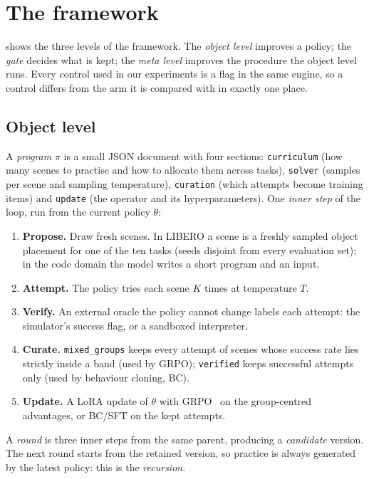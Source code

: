 \section{The framework}
\label{sec:framework}

 shows the three levels of the framework. The \emph{object level} improves a policy; the \emph{gate} decides what is kept; the \emph{meta level} improves the procedure the object level runs. Every control used in our experiments is a flag in the same engine, so a control differs from the arm it is compared with in exactly one place.

\subsection{Object level}
A \emph{program} $\pi$ is a small JSON document with four sections: \texttt{curriculum} (how many scenes to practise and how to allocate them across tasks), \texttt{solver} (samples per scene and sampling temperature), \texttt{curation} (which attempts become training items) and \texttt{update} (the operator and its hyperparameters). One \emph{inner step} of the loop, run from the current policy $\theta$:
\begin{enumerate}[nosep]
  \item \textbf{Propose.} Draw fresh scenes. In LIBERO a scene is a freshly sampled object placement for one of the ten tasks (seeds disjoint from every evaluation set); in the code domain the model writes a short program and an input.
  \item \textbf{Attempt.} The policy tries each scene $K$ times at temperature $T$.
  \item \textbf{Verify.} An external oracle the policy cannot change labels each attempt: the simulator's success flag, or a sandboxed interpreter.
  \item \textbf{Curate.} \texttt{mixed\_groups} keeps every attempt of scenes whose success rate lies strictly inside a band (used by GRPO); \texttt{verified} keeps successful attempts only (used by behaviour cloning, BC).
  \item \textbf{Update.} A LoRA update of $\theta$ with GRPO~\cite{shao2024deepseekmath} on the group-centred advantages, or BC/SFT on the kept attempts.
\end{enumerate}
A \emph{round} is three inner steps from the same parent, producing a \emph{candidate} version. The next round starts from the retained version, so practice is always generated by the latest policy: this is the \emph{recursion}.

